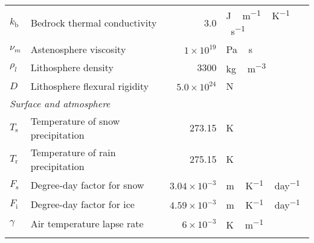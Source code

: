 \documentclass[tc, manuscript]{copernicus}
\begin{document}
\begin{table*}
{\begin{tabular}{llrl}
    $k_{\mathrm{b}}$   & Bedrock thermal conductivity
            & 3.0
            & \unit{J\,m^{-1}\,K^{-1}\,s^{-1}} \\

    $\nu_m$ & Astenosphere viscosity
            & $1\times10^{19}$
            & \unit{Pa\,s} \\

    $\rho_l$& Lithosphere density
            & 3300
            & \unit{kg\,m^{-3}} \\

    $D$     & Lithosphere flexural rigidity
            & $5.0\times10^{24}$
            & \unit{N} \\

    \multicolumn{2}{l}{\emph{Surface and atmosphere}} \\

    $T_{\mathrm{s}}$   & Temperature of snow precipitation
            & 273.15
            & \unit{K} \\

    $T_{\mathrm{r}}$   & Temperature of rain precipitation
            & 275.15
            & \unit{K} \\

    $F_{\mathrm{s}}$   & Degree-day factor for snow
            & $3.04\times10^{-3}$
            & \unit{m\,K^{-1}\,day^{-1}} \\

    $F_{\mathrm{i}}$   & Degree-day factor for ice
            & $4.59\times10^{-3}$
            & \unit{m\,K^{-1}\,day^{-1}} \\

    $\gamma$& Air temperature lapse rate
            & $6\times10^{-3}$
            & \unit{K\,m^{-1}} \\

    \bottomhline
  \end{tabular}}
  \belowtable{}
\end{table*}
\end{document}
